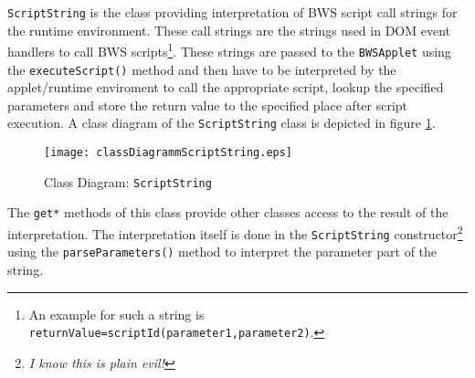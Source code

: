 \texttt{ScriptString} is the class providing interpretation of BWS script call strings for the runtime environment. These call strings are the strings used in DOM event handlers to call BWS scripts\footnote{An example for such a string is \texttt{returnValue=scriptId(parameter1,parameter2)}.}. These strings are passed to the \texttt{BWSApplet} using the \texttt{executeScript()} method and then have to be interpreted by the applet/runtime enviroment to call the appropriate script, lookup the specified parameters and store the return value to the specified place after script execution. A class diagram of the \texttt{ScriptString} class is depicted in figure \ref{fig:classDiagramScriptString}.

\begin{figure}[htbp]
	\centering
		\texttt{[image: classDiagrammScriptString.eps]}
		\caption{Class Diagram: \texttt{ScriptString}}
	\label{fig:classDiagramScriptString}
\end{figure}

The \texttt{get*} methods of this class provide other classes access to the result of the interpretation. The interpretation itself is done in the \texttt{ScriptString} constructor\footnote{\emph{I know this is plain evil!}} using the \texttt{parseParameters()} method to interpret the parameter part of the string.